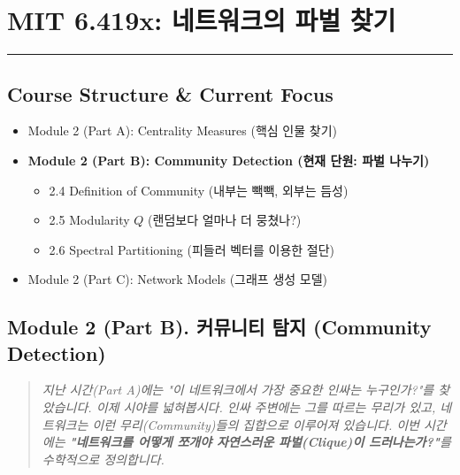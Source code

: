 \documentclass[11pt,a4paper]{book}
\theoremstyle{definition}
\begin{document}
\chapter{MIT 6.419x: 네트워크의 파벌 찾기}
\label{ch:lecture5}


\vspace{1cm}
\hrule
\vspace{1cm}

\section*{Course Structure \& Current Focus}
\begin{itemize}
    \item Module 2 (Part A): Centrality Measures (핵심 인물 찾기)
    \item \textbf{\textcolor{mainblue}{Module 2 (Part B): Community Detection (현재 단원: 파벌 나누기)}}
    \begin{itemize}
        \item 2.4 Definition of Community (내부는 빽빽, 외부는 듬성)
        \item 2.5 Modularity $Q$ (랜덤보다 얼마나 더 뭉쳤나?)
        \item 2.6 Spectral Partitioning (피들러 벡터를 이용한 절단)
    \end{itemize}
    \item Module 2 (Part C): Network Models (그래프 생성 모델)
\end{itemize}


\section{Module 2 (Part B). 커뮤니티 탐지 (Community Detection)}

\begin{quote}
\textit{지난 시간(Part A)에는 "이 네트워크에서 가장 중요한 인싸는 누구인가?"를 찾았습니다. 이제 시야를 넓혀봅시다. 인싸 주변에는 그를 따르는 무리가 있고, 네트워크는 이런 무리(Community)들의 집합으로 이루어져 있습니다. 이번 시간에는 \textbf{"네트워크를 어떻게 쪼개야 자연스러운 파벌(Clique)이 드러나는가?"}를 수학적으로 정의합니다.}
\end{quote}
\end{document}
